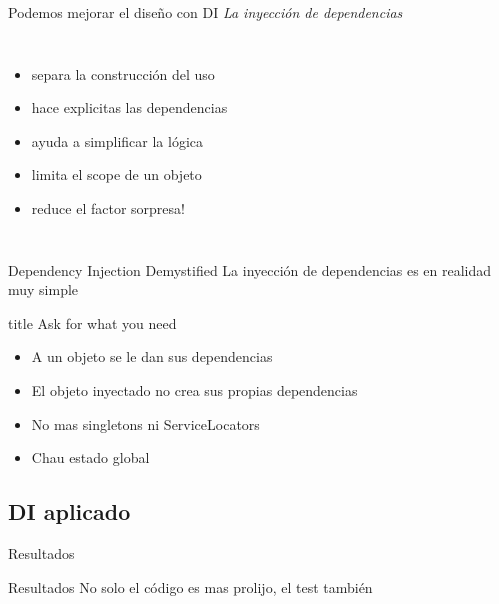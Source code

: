 \begin{frame}{Podemos mejorar el dise\~no con DI}
\textit{ La inyecci\'on de dependencias }
\bigskip
\begin{columns}
	\begin{itemize}
		\item separa la construcci\'on del uso
		\item hace explicitas las dependencias
		\item ayuda a simplificar la l\'ogica
		\item limita el scope de un objeto
		\item reduce el factor sorpresa!
	\end{itemize}
\end{columns}
\end{frame}

\begin{frame}{Dependency Injection Demystified}
La inyecci\'on de dependencias es en realidad muy simple
\bigskip \\
\bigskip
\begin{beamercolorbox}[sep=.1cm,shadow=true,rounded=true,center]{title}
	Ask for what you need
\end{beamercolorbox}
\bigskip
\begin{itemize}
	\item A un objeto se le dan sus dependencias
	\item El objeto inyectado no crea sus propias dependencias
	\item No mas singletons ni ServiceLocators
	\item Chau estado global
\end{itemize}
\end{frame}

\subsection{DI aplicado}
\begin{frame}[shrink=2]{Resultados}
	
\end{frame}

\begin{frame}{Resultados}
	No solo el c\'odigo es mas prolijo, el test tambi\'en
	
\end{frame}

